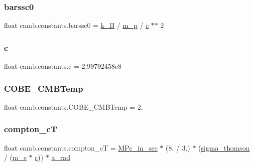 \mbox{\label{namespacecamb_1_1constants_a22858197d795f4639a5aa73400d495ea}} 
\subsubsection{\texorpdfstring{barssc0}{barssc0}}
{\footnotesize\ttfamily float camb.\+constants.\+barssc0 = \mbox{\hyperlink{namespacecamb_1_1constants_af524d81ee3b1617ff9509b924eae87cd}{k\+\_\+B}} / \mbox{\hyperlink{namespacecamb_1_1constants_a46a0d5c81f78ddacabc8b8934ef83ce0}{m\+\_\+p}} / \mbox{\hyperlink{namespacecamb_1_1constants_a08e77640ea70d03f8c60ba9f7f2644b9}{c}} $\ast$$\ast$ 2}

\mbox{\label{namespacecamb_1_1constants_a08e77640ea70d03f8c60ba9f7f2644b9}} 
\subsubsection{\texorpdfstring{c}{c}}
{\footnotesize\ttfamily float camb.\+constants.\+c = 2.\+99792458e8}

\mbox{\label{namespacecamb_1_1constants_a021083fae909f391c578458f5ddafc75}} 
\subsubsection{\texorpdfstring{C\+O\+B\+E\+\_\+\+C\+M\+B\+Temp}{COBE\_CMBTemp}}
{\footnotesize\ttfamily float camb.\+constants.\+C\+O\+B\+E\+\_\+\+C\+M\+B\+Temp = 2.}

\mbox{\label{namespacecamb_1_1constants_adf68bde9d9cb0164076b750914901b55}} 
\subsubsection{\texorpdfstring{compton\+\_\+cT}{compton\_cT}}
{\footnotesize\ttfamily float camb.\+constants.\+compton\+\_\+cT = \mbox{\hyperlink{namespacecamb_1_1constants_a06b4573b5a8bbe0912b23507b6935679}{M\+Pc\+\_\+in\+\_\+sec}} $\ast$ (8. / 3.) $\ast$ (\mbox{\hyperlink{namespacecamb_1_1constants_a54e7464202a97543518691e8cd2120ce}{sigma\+\_\+thomson}} / (\mbox{\hyperlink{namespacecamb_1_1constants_a032e7b8bd00a45909d2e468080381ea1}{m\+\_\+e}} $\ast$ \mbox{\hyperlink{namespacecamb_1_1constants_a08e77640ea70d03f8c60ba9f7f2644b9}{c}})) $\ast$ \mbox{\hyperlink{namespacecamb_1_1constants_a09428c5382962f64116178df09f92544}{a\+\_\+rad}}}

